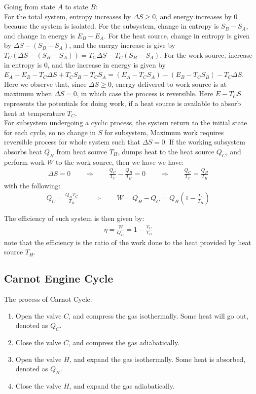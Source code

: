 \documentclass[11pt,oneside]{book}
\theoremstyle{break}
\theoremstyle{break}
\begin{document}
Going from state $A$ to state $B$: \\
For the total system, entropy increases by $\Delta S \geq 0$, and energy increases by $0$ because the system is isolated. For the subsystem, change in entropy is $S_B - S_A$, and change in energy is $E_B-E_A$. For the heat source, change in entropy is given by $\Delta S - (S_B - S_A)$, and the energy increase is give by $T_C(\Delta S-(S_B - S_A)) = T_C \Delta S - T_C(S_B-S_A)$. For the work source, increase in entropy is $0$, and the increase in energy is given by $E_A - E_B - T_C\Delta S + T_CS_B -T_CS_A = (E_A - T_CS_A) - (E_B - T_CS_B)-T_C\Delta S$. \\

Here we observe that, since $\Delta S \geq 0$, energy delivered to work source is at maximum when $\Delta S = 0$, in which case the process is reversible. Here $E - T_CS$ represents the potentials for doing work, if a heat source is available to absorb heat at temperature $T_C$.\\

For subsystem undergoing a cyclic process, the system return to the initial state for each cycle, so no change in $S$ for subsystem, Maximum work requires reversible process for whole system such that $\Delta S = 0$. If the working subsystem absorbs heat $Q_H$ from heat source $T_H$, dumps heat to the heat source $Q_C$, and perform work $W$ to the work source, then we have we have:
\begin{align*}
\Delta S = 0 \qquad \Rightarrow \qquad \frac{Q_C}{T_C} - \frac{Q_H}{T_H} = 0 \qquad \Rightarrow \qquad \frac{Q_C}{T_C} = \frac{Q_H}{T_H}
\end{align*}
with the following:
\begin{align*}
Q_C = \frac{Q_HT_C}{T_H}\qquad \Rightarrow \qquad W = Q_H - Q_C= Q_H \left(1- \frac{T_C}{T_H}\right)
\end{align*}

The efficiency of such system is then given by:
\begin{align*}
\eta = \frac{W}{Q_H} = 1-\frac{T_C}{T_H}
\end{align*}
note that the efficiency is the ratio of the work done to the heat provided by heat source $T_H$. 

\newpage
\subsection{Carnot Engine Cycle}
The process of Carnot Cycle:
\begin{enumerate}[topsep=3pt,itemsep=-1ex,partopsep=1ex,parsep=1ex]
\item Open the valve $C$, and compress the gas isothermally. Some heat will go out, denoted as $Q_C$.
\item Close the valve $C$, and compress the gas adiabatically. 
\item Open the valve $H$, and expand the gas isothermally. Some heat is absorbed, denoted as $Q_H$.
\item Close the valve $H$, and expand the gas adiabatically.
\end{enumerate}
\end{document}
